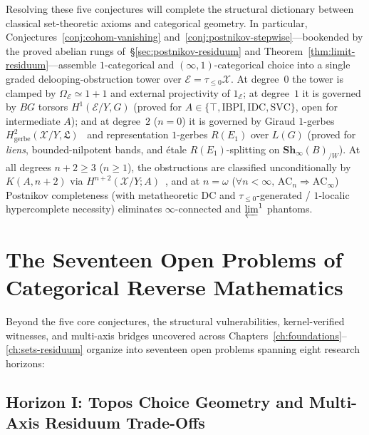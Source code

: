 Resolving these five conjectures will complete the structural dictionary between classical set-theoretic axioms and categorical geometry. In particular, Conjectures~\ref{conj:cohom-vanishing} and~\ref{conj:postnikov-stepwise}---bookended by the proved abelian rungs of~\S\ref{sec:postnikov-residuum} and Theorem~\ref{thm:limit-residuum}---assemble $1$-categorical and $(\infty, 1)$-categorical choice into a single graded delooping-obstruction tower over $\mathcal{E} = \tau_{\le 0}\mathcal{X}$. At degree~$0$ the tower is clamped by $\Omega_{\mathcal{E}} \simeq 1+1$ and external projectivity of $1_{\mathcal{E}}$; at degree~$1$ it is governed by $BG$ torsors $H^1(\mathcal{E}/Y, G)$ (proved for $A \in \{\top, \mathrm{IBPI}, \mathrm{IDC}, \mathrm{SVC}\}$, open for intermediate $A$); and at degree~$2$ ($n = 0$) it is governed by Giraud $1$-gerbes $H^2_{\mathrm{gerbe}}(\mathcal{X}/Y, \mathfrak{L})$~\cite{Giraud71} and representation $1$-gerbes $R(E_1)$ over $L(G)$ (proved for \emph{liens}, bounded-nilpotent bands, and \'etale $R(E_1)$-splitting on $\mathbf{Sh}_\infty(B)_{/W}$). At all degrees $n + 2 \ge 3$ ($n \ge 1$), the obstructions are classified unconditionally by $K(A, n+2)$ via $H^{n+2}(\mathcal{X}/Y; A)$~\cite[\S7.2.2]{Lurie09}, and at $n = \omega$ ($\forall n < \infty,\, \mathrm{AC}_n \Rightarrow \mathrm{AC}_\infty$) Postnikov completeness (with metatheoretic $\mathrm{DC}$ and $\tau_{\le 0}$-generated / $1$-localic hypercomplete necessity) eliminates $\infty$-connected and $\varprojlim^1$ phantoms.

\section{The Seventeen Open Problems of Categorical Reverse Mathematics}\label{sec:seventeen-open-problems}

Beyond the five core conjectures, the structural vulnerabilities, kernel-verified witnesses, and multi-axis bridges uncovered across Chapters~\ref{ch:foundations}--\ref{ch:sets-residuum} organize into seventeen open problems spanning eight research horizons:

\subsection*{Horizon I: Topos Choice Geometry and Multi-Axis Residuum Trade-Offs}

